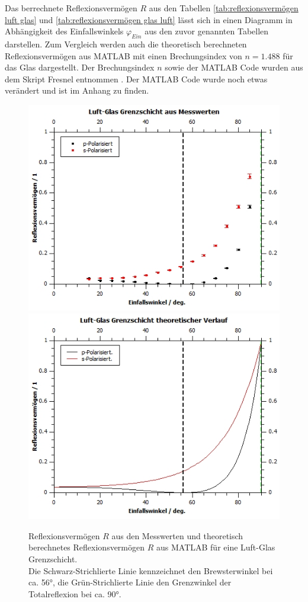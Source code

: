 \documentclass[12pt,a4paper,twoside]{article}
\begin{document}
\noindent
Das berrechnete Reflexionsvermögen $R$ aus den Tabellen \ref{tab:reflexionsvermögen luft glas} und \ref{tab:reflexionsvermögen glas luft} 
lässt sich in einen Diagramm in Abhängigkeit des Einfallswinkels $\varphi_{Ein}$ aus den zuvor genannten Tabellen darstellen. Zum Vergleich werden auch die theoretisch berechneten Reflexionsvermögen aus MATLAB mit einen Brechungsindex von $n=1.488$ für das Glas dargestellt. 
Der Brechungsindex $n$ sowie der MATLAB Code wurden aus dem Skript Fresnel entnommen \cite{teachcenter2}. 
Der MATLAB Code wurde noch etwas verändert und ist im Anhang zu finden. 

\begin{figure}[H]
    \centering
    \includegraphics[width=0.6\linewidth]{nudes/LG Mess.jpg}
    \includegraphics[width=0.6\linewidth]{nudes/LG theor.jpg}
    \caption{Reflexionsvermögen $R$ aus den Messwerten und theoretisch berechnetes Reflexionsvermögen $R$ aus MATLAB für eine Luft-Glas Grenzschicht. \\
    Die Schwarz-Strichlierte Linie kennzeichnet den Brewsterwinkel bei ca. 56°, die Grün-Strichlierte Linie den Grenzwinkel der Totalreflexion bei ca. 90°. }
    \label{fig:reflexionsvermögen LG}
\end{figure}
\end{document}
